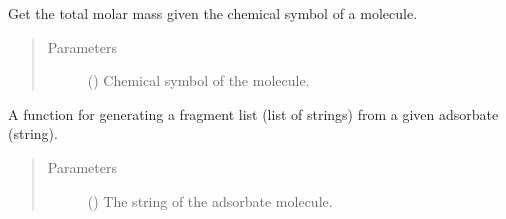 \documentclass[letterpaper,10pt,english]{sphinxmanual}
\begin{document}

\begin{fulllineitems}
\label{\detokenize{utilities:acat.utilities.get_total_masses}}
Get the total molar mass given the chemical symbol of a
molecule.
\begin{quote}\begin{description}
\item[{Parameters}] \leavevmode
{} () \textendash{} Chemical symbol of the molecule.

\end{description}\end{quote}

\end{fulllineitems}


\begin{fulllineitems}
\label{\detokenize{utilities:acat.utilities.string_fragmentation}}
A function for generating a fragment list (list of strings)
from a given adsorbate (string).
\begin{quote}\begin{description}
\item[{Parameters}] \leavevmode
{} () \textendash{} The string of the adsorbate molecule.

\end{description}\end{quote}

\end{fulllineitems}

\end{document}
